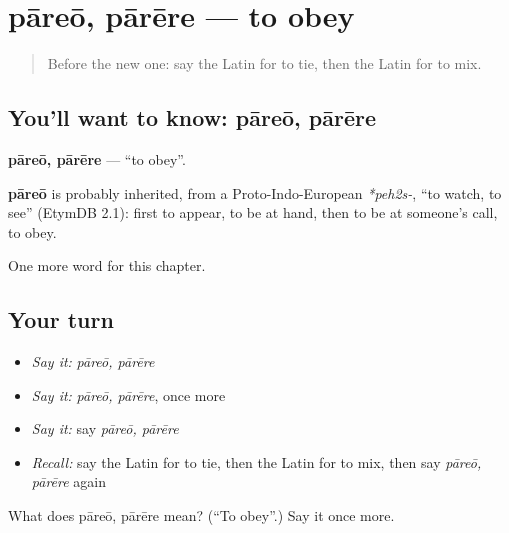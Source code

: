 \section[pāreō, pārēre]{pāreō, pārēre — to obey}

\label{lesson:LA-C233-pareo}



\begin{quote}
Before the new one: say the Latin for to tie, then the Latin for to mix.
\end{quote}

\subsection*{You'll want to know: pāreō, pārēre}
\textbf{pāreō, pārēre} — \textquotedblleft{}to obey\textquotedblright{}.

\begin{cousinweb}
\textbf{pāreō} is probably inherited, from a Proto-Indo-European \emph{*peh2s-}, \textquotedblleft{}to watch, to see\textquotedblright{} (EtymDB 2.1): first to appear, to be at hand, then to be at someone's call, to obey.
\end{cousinweb}

\begin{grammarlens}[title={What you've built}]
One more word for this chapter.
\end{grammarlens}

\subsection*{Your turn}
\begin{itemize}
\raggedright
  \item \emph{Say it:} \emph{pāreō, pārēre}
  \item \emph{Say it:} \emph{pāreō, pārēre}, once more
  \item \emph{Say it:} say \emph{pāreō, pārēre}
  \item \emph{Recall:} say the Latin for to tie, then the Latin for to mix, then say \emph{pāreō, pārēre} again
\end{itemize}

\begin{tcolorbox}[breakable,colback=teal!4,colframe=teal!35!black,title={Before you move on}]
What does pāreō, pārēre mean? (\textquotedblleft{}To obey\textquotedblright{}.) Say it once more.
\end{tcolorbox}
